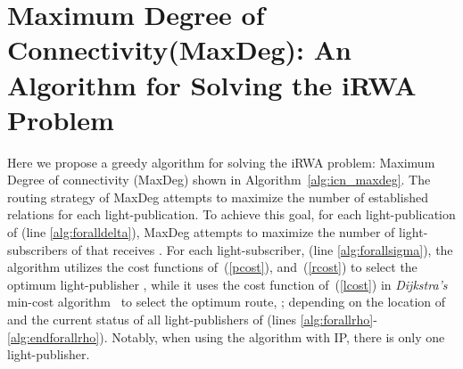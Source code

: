 \documentclass[journal]{IEEEtran}
\begin{document}
\section{Maximum Degree of Connectivity(MaxDeg): An Algorithm for Solving the iRWA Problem}\label{sec:alg}
Here we propose a greedy algorithm for solving the iRWA problem: Maximum Degree of connectivity (MaxDeg) shown in Algorithm~\ref{alg:icn_maxdeg}. The routing strategy of MaxDeg attempts to maximize the number of established relations for each light-publication.
To achieve this goal, for each light-publication  of  (line \ref{alg:foralldelta}), MaxDeg attempts to maximize the number of light-subscribers  of  that receives . For each light-subscriber,  (line \ref{alg:forallsigma}),
 the algorithm utilizes the cost functions of~(\ref{pcost}),
 and~(\ref{rcost}) to select the optimum light-publisher ,
 while it uses the cost function of~(\ref{lcost}) in \emph{Dijkstra's} min-cost algorithm~\cite{dij:rwa} to select the optimum route, ; depending on the location of  and the current status of all light-publishers of  (lines \ref{alg:forallrho}-\ref{alg:endforallrho}).
Notably, when using the algorithm with IP, there is only one light-publisher.
 
\end{document}
